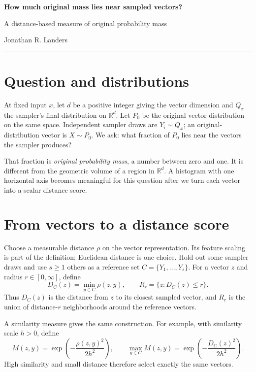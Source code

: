 \documentclass[10pt,letterpaper]{article}
\theoremstyle{typed}
\begin{document}
\pagestyle{fancy}
\thispagestyle{fancy}

{\Large\bfseries How much original mass lies near sampled vectors?}\par
{\small A distance-based measure of original probability mass}\par
{\small Jonathan R. Landers}\par
\vspace{0.25em}\noindent\rule{\textwidth}{0.5pt}

\section{Question and distributions}

At fixed input $x$, let $d$ be a positive integer giving the vector dimension and $Q_x$ the sampler's final distribution on $\mathbb{R}^d$. Let $P_0$ be the original vector distribution on the same space. Independent sampler draws are $Y_i\sim Q_x$; an original-distribution vector is $X\sim P_0$. We ask: what fraction of $P_0$ lies near the vectors the sampler produces?

That fraction is \emph{original probability mass}, a number between zero and one. It is different from the geometric volume of a region in $\mathbb{R}^d$. A histogram with one horizontal axis becomes meaningful for this question after we turn each vector into a scalar distance score.

\section{From vectors to a distance score}

Choose a measurable distance $\rho$ on the vector representation. Its feature scaling is part of the definition; Euclidean distance is one choice. Hold out some sampler draws and use $s\geq1$ others as a reference set $C=\{Y_1,\ldots,Y_s\}$. For a vector $z$ and radius $r\in[0,\infty]$, define
\begin{equation}
  D_C(z)=\min_{y\in C}\rho(z,y),\qquad
  R_r=\{z:D_C(z)\leq r\}.
  \label{eq:region}
\end{equation}
Thus $D_C(z)$ is the distance from $z$ to its closest sampled vector, and $R_r$ is the union of distance-$r$ neighborhoods around the reference vectors.

A similarity measure gives the same construction. For example, with similarity scale $h>0$, define
\begin{equation}
  M(z,y)=\exp\!\left(-\frac{\rho(z,y)^2}{2h^2}\right),\qquad
  \max_{y\in C}M(z,y)=\exp\!\left(-\frac{D_C(z)^2}{2h^2}\right).
  \label{eq:similarity}
\end{equation}
High similarity and small distance therefore select exactly the same vectors.
\end{document}
